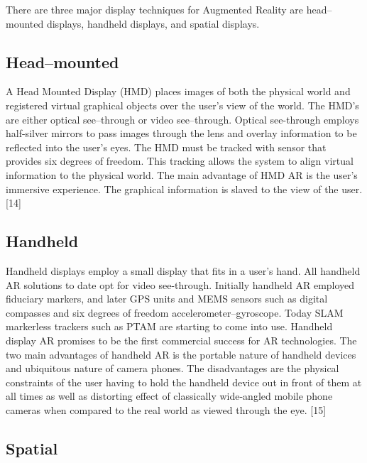 There are three major display techniques for Augmented Reality are head–mounted displays, handheld displays, and spatial displays.

\subsection{Head–mounted}

A Head Mounted Display (HMD) places images of both the physical world and registered virtual graphical objects over the user's view of the world. The HMD's are either optical see–through or video see–through. Optical see-through employs half-silver mirrors to pass images through the lens and overlay information to be reflected into the user's eyes. The HMD must be tracked with sensor that provides six degrees of freedom. This tracking allows the system to align virtual information to the physical world. The main advantage of HMD AR is the user's immersive experience. The graphical information is slaved to the view of the user.[14]

\subsection{Handheld} 

Handheld displays employ a small display that fits in a user's hand. All handheld AR solutions to date opt for video see-through. Initially handheld AR employed fiduciary markers, and later GPS units and MEMS sensors such as digital compasses and six degrees of freedom accelerometer–gyroscope. Today SLAM markerless trackers such as PTAM are starting to come into use. Handheld display AR promises to be the first commercial success for AR technologies. The two main advantages of handheld AR is the portable nature of handheld devices and ubiquitous nature of camera phones. The disadvantages are the physical constraints of the user having to hold the handheld device out in front of them at all times as well as distorting effect of classically wide-angled mobile phone cameras when compared to the real world as viewed through the eye. [15]

\subsection{Spatial}

